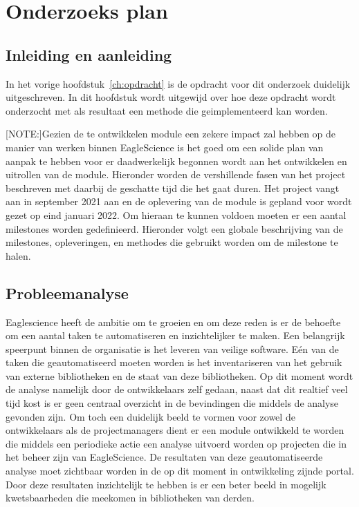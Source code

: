 \chapter{Onderzoeks plan}\label{ch:onderzoekPlan}


\section{Inleiding en aanleiding}\label{sec:inleiding-en-aanleiding}%
In het vorige hoofdstuk~\ref{ch:opdracht} is de opdracht voor dit onderzoek duidelijk uitgeschreven. In dit hoofdstuk wordt uitgewijd over hoe deze opdracht wordt onderzocht met als resultaat een methode die geimplementeerd kan worden.

[NOTE:]Gezien de te ontwikkelen module een zekere impact zal hebben op de manier van werken binnen EagleScience is het goed om een solide plan van aanpak te hebben voor er daadwerkelijk begonnen wordt aan het ontwikkelen en uitrollen van de module. Hieronder worden de vershillende fasen van het project beschreven met daarbij de geschatte tijd die het gaat duren. Het project vangt aan in september 2021 aan en de oplevering van de module is gepland voor wordt gezet op eind januari 2022. Om hieraan te kunnen voldoen moeten er een aantal milestones worden gedefinieerd. Hieronder volgt een globale beschrijving van de milestones, opleveringen, en methodes die gebruikt worden om de milestone te halen.


\section{Probleemanalyse}\label{sec:probleemanalyse}
Eaglescience heeft de ambitie om te groeien en om deze reden is er de behoefte om een aantal taken te automatiseren en inzichtelijker te maken. Een belangrijk speerpunt binnen de organisatie is het leveren van veilige software. Eén van de taken die geautomatiseerd moeten worden is het inventariseren van het gebruik van externe bibliotheken en de staat van deze bibliotheken. Op dit moment wordt de analyse namelijk door de ontwikkelaars zelf gedaan, naast dat dit realtief veel tijd kost is er geen centraal overzicht in de bevindingen die middels de analyse gevonden zijn. Om toch een duidelijk beeld te vormen voor zowel de ontwikkelaars als de projectmanagers dient er een module ontwikkeld te worden die middels een periodieke actie een analyse uitvoerd worden op projecten die in het beheer zijn van EagleScience. De resultaten van deze geautomatiseerde analyse moet zichtbaar worden in de op dit moment in ontwikkeling zijnde portal. Door deze resultaten inzichtelijk te hebben is er een beter beeld in mogelijk kwetsbaarheden die meekomen in bibliotheken van derden.

